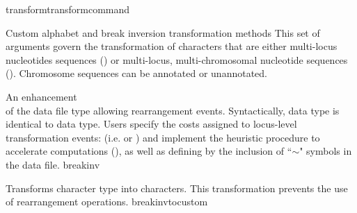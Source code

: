 \begin{command}{transform}{transformcommand}
\begin{arguments}
\begin{argumentgroup}{Custom alphabet and break inversion transformation methods}   
     	This set of arguments govern the transformation of characters that are either multi-locus nucleotides 
	sequences () or multi-locus, multi-chromosomal nucleotide
	sequences ().  Chromosome sequences can be \poyargument
	{annotated} or unannotated.
	
                {An enhancement \\ of the data file type  allowing
           	 rearrangement events. Syntactically,  data type is identical to 
            	 data type. Users specify 
                the costs assigned to locus-level transformation events: (i.e. 
                 or  ) 
                and implement the heuristic  procedure to accelerate computations 
                (), as well as defining  by the 
                inclusion of ``$\sim$" symbols in the data file.} 
                {breakinv}
                
                {Transforms  character type into  characters.
                This transformation prevents the use of rearrangement operations.}
                 {breakinvtocustom}

                

\end{argumentgroup}
\end{arguments}
\end{command}
